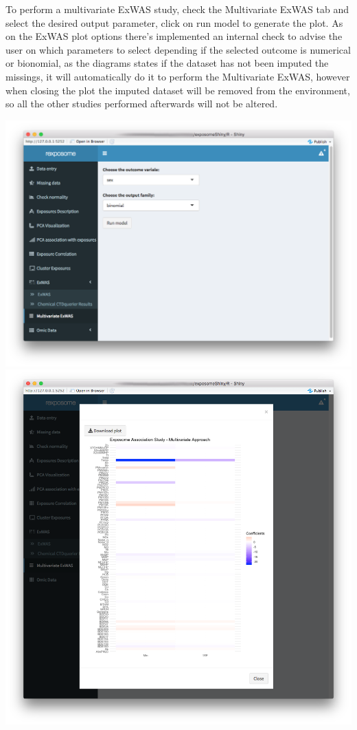 \documentclass[
]{book}
\begin{document}
To perform a multivariate ExWAS study, check the Multivariate ExWAS tab and select the desired output parameter, click on run model to generate the plot. As on the ExWAS plot options there's implemented an internal check to advise the user on which parameters to select depending if the selected outcome is numerical or bionomial, as the diagrams states if the dataset has not been imputed the missings, it will automatically do it to perform the Multivariate ExWAS, however when closing the plot the imputed dataset will be removed from the environment, so all the other studies performed afterwards will not be altered.

\includegraphics{images/analysis8_2.png} \includegraphics{images/analysis8_3.png}
\end{document}

